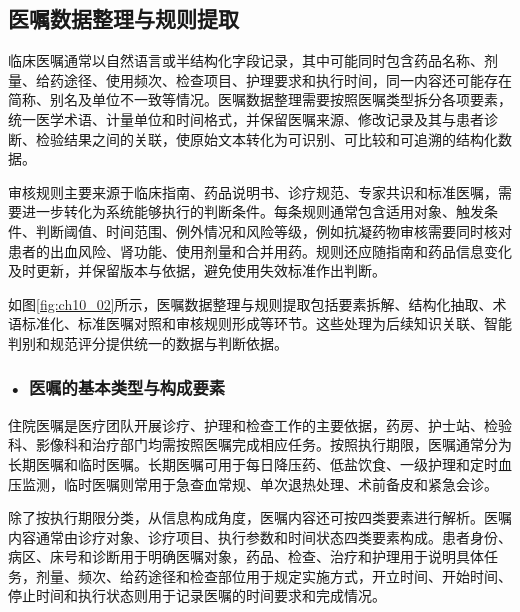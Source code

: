 \subsection{医嘱数据整理与规则提取}

临床医嘱通常以自然语言或半结构化字段记录，其中可能同时包含药品名称、剂量、给药途径、使用频次、检查项目、护理要求和执行时间，同一内容还可能存在简称、别名及单位不一致等情况。医嘱数据整理需要按照医嘱类型拆分各项要素，统一医学术语、计量单位和时间格式，并保留医嘱来源、修改记录及其与患者诊断、检验结果之间的关联，使原始文本转化为可识别、可比较和可追溯的结构化数据。

审核规则主要来源于临床指南、药品说明书、诊疗规范、专家共识和标准医嘱，需要进一步转化为系统能够执行的判断条件。每条规则通常包含适用对象、触发条件、判断阈值、时间范围、例外情况和风险等级，例如抗凝药物审核需要同时核对患者的出血风险、肾功能、使用剂量和合并用药。规则还应随指南和药品信息变化及时更新，并保留版本与依据，避免使用失效标准作出判断。

如图\ref{fig:ch10_02}所示，医嘱数据整理与规则提取包括要素拆解、结构化抽取、术语标准化、标准医嘱对照和审核规则形成等环节。这些处理为后续知识关联、智能判别和规范评分提供统一的数据与判断依据。


\par
\noindent\begin{minipage}{\textwidth}
\centering
{}
\label{fig:ch10_02}
\end{minipage}
\par

\subsubsection*{\textbf{• 医嘱的基本类型与构成要素}}

住院医嘱是医疗团队开展诊疗、护理和检查工作的主要依据，药房、护士站、检验科、影像科和治疗部门均需按照医嘱完成相应任务。按照执行期限，医嘱通常分为长期医嘱和临时医嘱。长期医嘱可用于每日降压药、低盐饮食、一级护理和定时血压监测，临时医嘱则常用于急查血常规、单次退热处理、术前备皮和紧急会诊。

除了按执行期限分类，从信息构成角度，医嘱内容还可按四类要素进行解析。医嘱内容通常由诊疗对象、诊疗项目、执行参数和时间状态四类要素构成。患者身份、病区、床号和诊断用于明确医嘱对象，药品、检查、治疗和护理用于说明具体任务，剂量、频次、给药途径和检查部位用于规定实施方式，开立时间、开始时间、停止时间和执行状态则用于记录医嘱的时间要求和完成情况。

